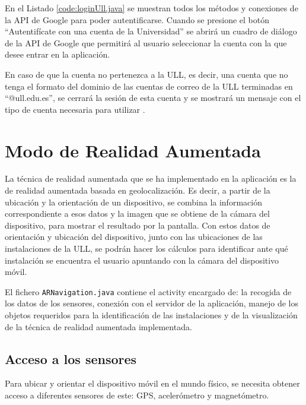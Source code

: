 En el Listado \ref{code:loginUll.java} se muestran todos los métodos y conexiones de la API de Google para poder autentificarse. Cuando se presione el botón ``Autentifícate con una cuenta de la Universidad'' se abrirá un cuadro de diálogo de la API de Google que permitirá al usuario seleccionar la cuenta con la que desee entrar en la aplicación. 

En caso de que la cuenta no pertenezca a la ULL, es decir, una cuenta que no tenga el formato del dominio de las cuentas de correo de la ULL terminadas en ``@ull.edu.es'', se cerrará la sesión de esta cuenta y se mostrará un mensaje con el tipo de cuenta necesaria para utilizar  \ULLAR{}.

\bigskip


 
\section{Modo de Realidad Aumentada}

La técnica de realidad aumentada que se ha implementado en la aplicación es la de realidad aumentada basada en geolocalización. Es decir, a partir de la ubicación y la orientación de un dispositivo, se combina la información correspondiente a esos datos y la imagen que se obtiene de la cámara del dispositivo, para mostrar el resultado por la pantalla. Con estos datos de orientación y ubicación del dispositivo, junto con las ubicaciones de las instalaciones de la ULL, se podrán hacer los cálculos para identificar ante qué instalación se encuentra el usuario apuntando con la cámara del dispositivo móvil.

El fichero \texttt{ARNavigation.java} contiene el activity encargado de: la recogida de los datos de los sensores, conexión con el servidor de la aplicación, manejo de los objetos requeridos para la identificación de las instalaciones y de la visualización de la técnica de realidad aumentada implementada.

\subsection{Acceso a los sensores}

Para ubicar y orientar el dispositivo móvil en el mundo físico, se necesita obtener acceso a diferentes sensores de este: GPS, acelerómetro y magnetómetro. 

